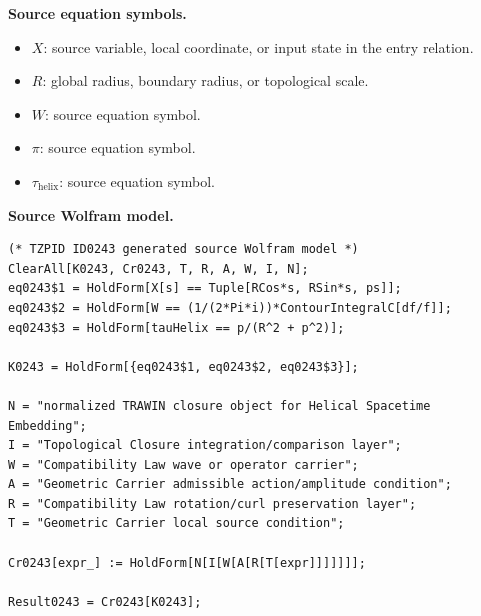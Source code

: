 \begin{minipage}[t]{0.49\linewidth}
\begingroup
\small
\raggedright
\textbf{Source equation symbols.}\par
\begin{itemize}[leftmargin=1.35em,itemsep=1pt,topsep=1pt,parsep=0pt]
    \item $X$: source variable, local coordinate, or input state in the entry relation.
    \item $R$: global radius, boundary radius, or topological scale.
    \item $W$: source equation symbol.
    \item $\pi$: source equation symbol.
    \item $\tau_{\mathrm{helix}}$: source equation symbol.
\end{itemize}
\endgroup
\end{minipage}\hfill
\begin{minipage}[t]{0.47\linewidth}
\begingroup
\scriptsize
\raggedright
\textbf{Source Wolfram model.}\par
\begin{Verbatim}[fontsize=\tiny,breaklines=true,breakanywhere=true]
(* TZPID ID0243 generated source Wolfram model *)
ClearAll[K0243, Cr0243, T, R, A, W, I, N];
eq0243$1 = HoldForm[X[s] == Tuple[RCos*s, RSin*s, ps]];
eq0243$2 = HoldForm[W == (1/(2*Pi*i))*ContourIntegralC[df/f]];
eq0243$3 = HoldForm[tauHelix == p/(R^2 + p^2)];

K0243 = HoldForm[{eq0243$1, eq0243$2, eq0243$3}];

N = "normalized TRAWIN closure object for Helical Spacetime Embedding";
I = "Topological Closure integration/comparison layer";
W = "Compatibility Law wave or operator carrier";
A = "Geometric Carrier admissible action/amplitude condition";
R = "Compatibility Law rotation/curl preservation layer";
T = "Geometric Carrier local source condition";

Cr0243[expr_] := HoldForm[N[I[W[A[R[T[expr]]]]]]];

Result0243 = Cr0243[K0243];
\end{Verbatim}
\endgroup
\end{minipage}

